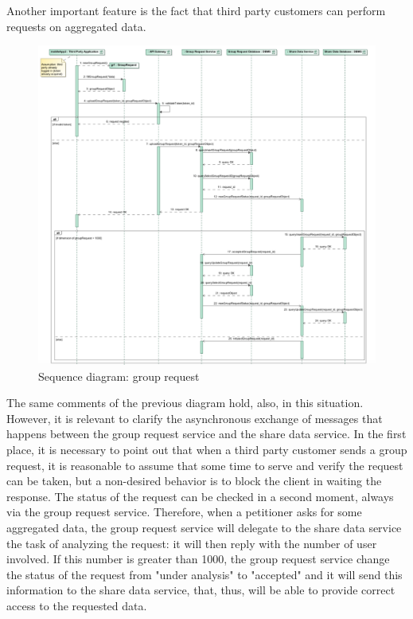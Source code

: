 \par 
Another important feature is the fact that third party customers can perform requests on aggregated data. \\


\begin{figure}[H]
\includegraphics[width=\linewidth]{Images/grouprequest.pdf}
\caption{ Sequence diagram: group request }
\label{fig:world2}
\end{figure}

The same comments of the previous diagram hold, also, in this situation. 
However, it is relevant to clarify the asynchronous exchange of messages that happens between the group request service and the share data
service. 
In the first place, it is necessary to point out that when a third party customer sends a group request, it is reasonable to assume that 
some time to serve and verify the request can be taken, but a non-desired behavior is to block the client in waiting the response. The status
of the request can be checked in a second moment, always via the group request service. 
Therefore, when a petitioner asks for some aggregated data, the group request service will delegate to the share data service the task of 
analyzing the request: it will then reply with the number of user involved. If this number is greater than 1000, the group request service
change the status of the request from "under analysis" to "accepted" and it will send this information to the share data service, that, thus,
will be able to provide correct access to the requested data. \\

